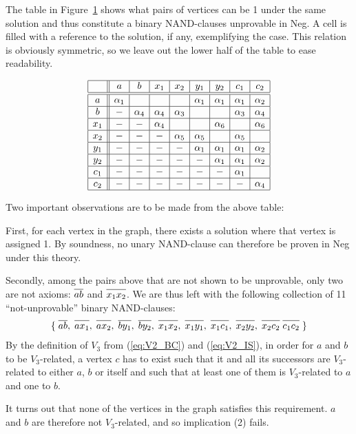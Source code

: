 The table in Figure~\ref{fig:v3_counter_table} shows what pairs of vertices can be 1 under the same solution and thus constitute a binary NAND-clauses unprovable in Neg.
A cell is filled with a reference to the solution, if any, exemplifying the case.
This relation is obviously symmetric, so we leave out the lower half of the table to ease readability.
\begin{figure}[!h]
  \centering
  \[\begin{array}{|c||c|c|c|c|c|c|c|c|}
    \hline
    & a & b & x_1 & x_2 & y_1 & y_2 & c_1 & c_2 \\ \hline\hline
    a & \alpha_1 & & & & \alpha_1 & \alpha_1 & \alpha_1 & \alpha_2 \\ \hline
    b &-& \alpha_4 & \alpha_4 & \alpha_3 & & & \alpha_3 & \alpha_4 \\ \hline
    x_1 &-&-& \alpha_4 & & & \alpha_6 & & \alpha_6 \\ \hline
    x_2 &-&-&-& \alpha_5 & \alpha_5 & & \alpha_5 & \\ \hline
    y_1 &-&-&-&-& \alpha_1 & \alpha_1 & \alpha_1 & \alpha_2 \\ \hline
    y_2 &-&-&-&-&-& \alpha_1 & \alpha_1 & \alpha_2 \\ \hline
    c_1 &-&-&-&-&-&-& \alpha_1 & \\ \hline
    c_2 &-&-&-&-&-&-&-& \alpha_4 \\ \hline
  \end{array}\]
  \caption{}
  \label{fig:v3_counter_table}
\end{figure}
\FloatBarrier
Two important observations are to be made from the above table:

First, for each vertex in the graph, there exists a solution where that vertex is assigned 1.
By soundness, no unary NAND-clause can therefore be proven in Neg under this theory.

Secondly, among the pairs above that are not shown to be unprovable, only two are not axioms: $\ol{ab}$ and $\ol{x_1x_2}$.
We are thus left with the following collection of 11 ``not-unprovable'' binary NAND-clauses:
\begin{align}
  \{\; \ol{ab},\; \ol{ax_1},\; \ol{ax_2},\; \ol{by_1},\; \ol{by_2},\; \ol{x_1x_2},\; \ol{x_1y_1},\; \ol{x_1c_1},\; \ol{x_2y_2},\; \ol{x_2c_2} \; \ol{c_1c_2}\; \}
\end{align}
By the definition of $V_3$ from (\ref{eq:V2_BC}) and (\ref{eq:V2_IS}), in order for $a$ and $b$ to be $V_3$-related, a vertex $c$ has to exist such that it and all its successors are $V_3$-related to either $a$, $b$ or itself and such that at least one of them is $V_3$-related to $a$ and one to $b$.

It turns out that none of the vertices in the graph satisfies this requirement.
$a$ and $b$ are therefore not $V_3$-related, and so implication (2) fails.
